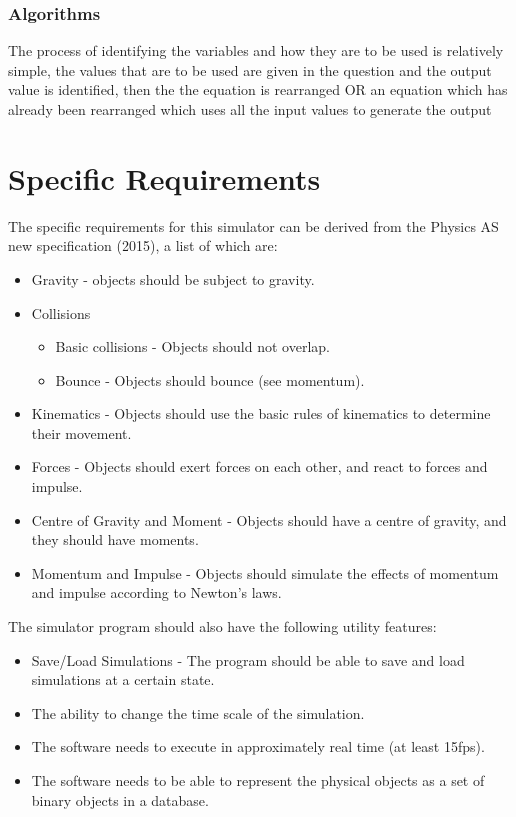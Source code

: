 \subsubsection{Algorithms}
	The process of identifying the variables and how they are to be used is relatively simple, the values that are to be used are given in the question and the output value is identified, then the the equation is rearranged OR an equation which has already been rearranged which uses all the input values to generate the output 
	


\section{Specific Requirements}
The specific requirements for this simulator can be derived from the Physics AS new specification (2015), a list of which are:
\begin{itemize}
	\item Gravity  - objects should be subject to gravity.
	\item Collisions
	\begin{itemize}
		\item Basic collisions - Objects should not overlap.
		\item Bounce - Objects should bounce (see momentum).
	\end{itemize}
	\item Kinematics - Objects should use the basic rules of kinematics to determine their movement.
	\item Forces - Objects should exert forces on each other, and react to forces and impulse.
	\item Centre of Gravity and Moment - Objects should have a centre of gravity, and they should have moments.
	\item Momentum and Impulse - Objects should simulate the effects of momentum and impulse according to Newton's laws.
\end{itemize}

The simulator program should also have the following utility features:
\begin{itemize}
	\item Save/Load Simulations - The program should be able to save and load simulations at a certain state.
	\item The ability to change the time scale of the simulation.
	\item The software needs to execute in approximately real time (at least 15fps).
	\item The software needs to be able to represent the physical objects as a set of binary objects in a database.

\end{itemize}

